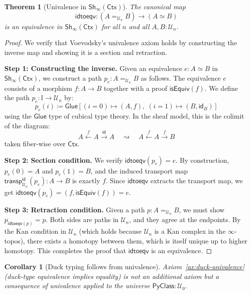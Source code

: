 \documentclass[11pt,a4paper]{report}
\theoremstyle{definition}
\theoremstyle{plain}
\newtheorem{theorem}[definition]{Theorem}
\newtheorem{corollary}[definition]{Corollary}
\newcommand{\PyClass}{\mathsf{PyClass}}
\newcommand{\interval}{\mathbb{I}}
\newcommand{\transp}{\mathsf{transp}}
\newcommand{\defeq}{\coloneqq}
\newcommand{\Glue}{\mathsf{Glue}}
\newcommand{\Ctx}{\mathsf{Ctx}}
\newcommand{\Sh}{\mathsf{Sh}}
\begin{document}
\begin{theorem}[Univalence in $\Sh_\infty(\Ctx)$]
\label{thm:univalence-model}
The canonical map
\[
  \mathsf{idtoeqv} : (A =_{\mathcal{U}_n} B) \to (A \simeq B)
\]
is an equivalence in $\Sh_\infty(\Ctx)$ for all $n$ and all $A, B : \mathcal{U}_n$.
\end{theorem}
\begin{proof}
We verify that Voevodsky's univalence axiom holds by constructing the inverse
map and showing it is a section and retraction.

\textbf{Step 1: Constructing the inverse.}
Given an equivalence $e : A \simeq B$ in $\Sh_\infty(\Ctx)$, we construct a path
$p_e : A =_{\mathcal{U}_n} B$ as follows.  The equivalence $e$ consists of a morphism
$f : A \to B$ together with a proof $\mathsf{isEquiv}(f)$.  We define the path
$p_e : \interval \to \mathcal{U}_n$ by:
\[
  p_e(i) \defeq \Glue\!\left[
    (i = 0) \mapsto (A, f),\;
    (i = 1) \mapsto (B, \mathsf{id}_B)
  \right]
\]
using the $\Glue$ type of cubical type theory.  In the sheaf model, this is
the colimit of the diagram:
\[
  A \xleftarrow{\;f\;} A \xrightarrow{\;\mathsf{id}\;} A
  \quad\rightsquigarrow\quad
  A \xleftarrow{\;f\;} A \xrightarrow{\;f\;} B
\]
taken fiber-wise over $\Ctx$.

\textbf{Step 2: Section condition.}
We verify $\mathsf{idtoeqv}(p_e) = e$.  By construction, $p_e(0) = A$ and
$p_e(1) = B$, and the induced transport map $\transp^{\mathsf{id}}_{\mathcal{U}_n}(p_e) : A \to B$
is exactly $f$.  Since $\mathsf{idtoeqv}$ extracts the transport map, we get
$\mathsf{idtoeqv}(p_e) = (f, \mathsf{isEquiv}(f)) = e$.

\textbf{Step 3: Retraction condition.}
Given a path $p : A =_{\mathcal{U}_n} B$, we must show
$p_{\mathsf{idtoeqv}(p)} = p$.  Both sides are paths in $\mathcal{U}_n$, and they
agree at the endpoints.  By the Kan condition in $\mathcal{U}_n$
(which holds because $\mathcal{U}_n$ is a Kan complex in the $\infty$-topos),
there exists a homotopy between them, which is itself unique up to higher
homotopy.  This completes the proof that $\mathsf{idtoeqv}$ is an equivalence.
\end{proof}

\begin{corollary}[Duck typing follows from univalence]
Axiom~\ref{ax:duck-univalence} (duck-type equivalence implies equality) is not
an additional axiom but a \emph{consequence} of univalence applied to the
universe $\PyClass : \mathcal{U}_0$.
\end{corollary}
\end{document}
